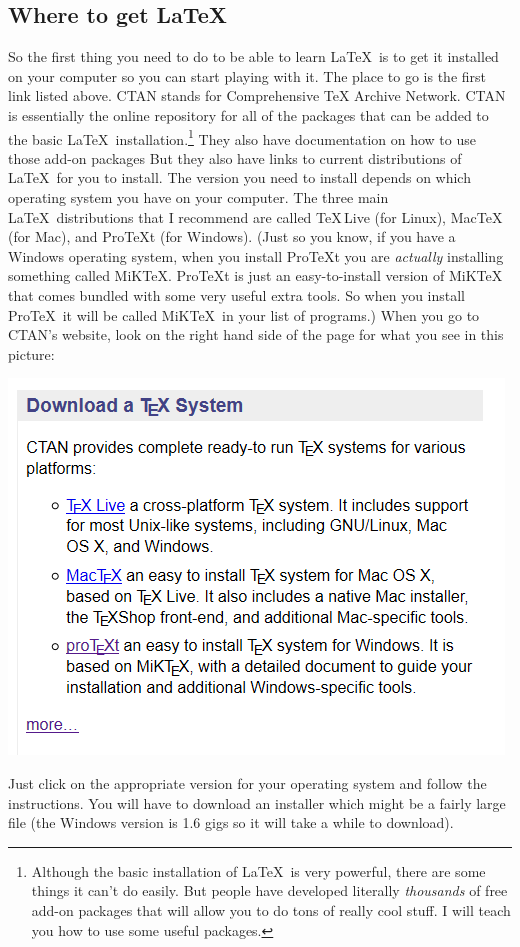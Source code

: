 \documentclass[11pt]{article}
\begin{document}
\subsection{Where to get \LaTeX}
So the first thing you need to do to be able to learn \LaTeX\ is to get it installed on your computer so you can start playing with it. The place to go is the first link listed above.  CTAN stands for Comprehensive TeX Archive Network.  CTAN is essentially the online repository for all of the packages that can be added to the basic \LaTeX\ installation.\footnote{Although the basic installation of \LaTeX\ is very powerful, there are some things it can't do easily.  But people have developed literally \emph{thousands} of free add-on packages that will allow you to do tons of really cool stuff.  I will teach you how to use some useful packages.}  They also have documentation on how to use those add-on packages  But they also have links to current distributions of \LaTeX\ for you to install.  The version you need to install depends on which operating system you have on your computer.  The three main \LaTeX\ distributions that I recommend are called \TeX\,Live (for Linux), Mac\TeX\, (for Mac), and Pro\TeX t (for Windows). (Just so you know, if you have a Windows operating system, when you install Pro\TeX t you are \emph{actually} installing something called MiK\TeX. Pro\TeX t is just an easy-to-install version of MiK\TeX\, that comes bundled with some very useful extra tools.  So when you install Pro\TeX\, it will be called MiK\TeX\, in your list of programs.)  When you go to CTAN's website, look on the right hand side of the page for what you see in this picture:\\
\begin{center}
\includegraphics[width=.6\columnwidth]{Capture}
\end{center}
Just click on the appropriate version for your operating system and follow the instructions.  You will have to download an installer which might be a fairly large file (the Windows version is 1.6 gigs so it will take a while to download).  
\end{document}

